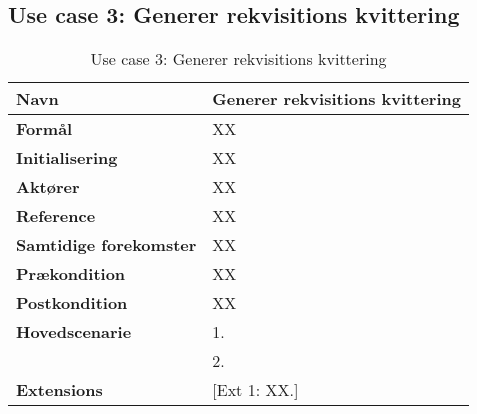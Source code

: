 \subsection{Use case 3: Generer rekvisitions kvittering}


\begin{table}[H]
\begin{tabularx}{\textwidth}{|l|X|}
\hline
\textbf{Navn}					& Generer rekvisitions kvittering \\\hline
\textbf{Formål}					& XX \\\hline
\textbf{Initialisering}			& XX \\\hline
\textbf{Aktører}				& XX \\\hline
\textbf{Reference}				& XX \\\hline
								
\textbf{Samtidige forekomster}	& XX \\\hline
\textbf{Prækondition}			& XX \\\hline
\textbf{Postkondition}			& XX \\\hline
\textbf{Hovedscenarie}			& 1. \\												& 2. \\\hline

\textbf{Extensions}				& [Ext 1: XX.] \\\hline
\end{tabularx}
\caption{Use case 3: Generer rekvisitions kvittering}
\label{tab:UCgrk}
\end{table}